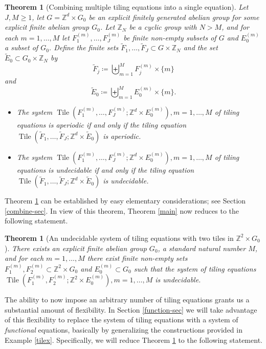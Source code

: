 \documentclass[reqno,a4paper,12pt]{amsart}
\numberwithin{equation}{section}
\numberwithin{figure}{section}
\def\Z{\mathbb{Z}}
\renewcommand\geq{\geqslant}
\newcommand{\Tile}{\operatorname{Tile}}
\theoremstyle{plain}
\newtheorem{theorem}[thm]{Theorem}
\theoremstyle{definition}
\begin{document}
\begin{theorem}[Combining multiple tiling equations into a single equation]\label{combine}  Let $J,M \geq 1$, let $G = \Z^d \times G_0$ be an explicit finitely generated abelian group for some explicit finite abelian group $G_0$.  Let $\Z_N$ be a cyclic group with $N>M$, and for each $m=1,\dots,M$ let $F_1^{(m)},\dots,F_J^{(m)}$ be finite non-empty subsets of $G$ and $E_0^{(m)}$ a subset of $G_0$.  Define the finite sets $\tilde F_1,\dots,\tilde F_J \subset G \times \Z_N$ and the set $\tilde E_0 \subset G_0 \times \Z_N$ by 
\begin{equation}\label{fj-stack}
 \tilde F_j \coloneqq \biguplus_{m=1}^M F_j^{(m)} \times \{m\}
 \end{equation}
and
\begin{equation}\label{e0-stack}
 \tilde E_0 \coloneqq \biguplus_{m=1}^M E_0^{(m)} \times \{m\}.
 \end{equation}
\begin{itemize}
\item[(i)]  The system $\Tile(F_1^{(m)},\dots,F_J^{(m)}; \Z^d \times E_0^{(m)}), m=1,\dots,M$ of tiling equations is aperiodic if and only if the tiling equation
$\Tile(\tilde F_1,\dots,\tilde F_J; \Z^d \times \tilde E_0)$ is aperiodic.
\item[(ii)]  The system $\Tile(F_1^{(m)},\dots,F_J^{(m)}; \Z^d \times E_0^{(m)}), m=1,\dots,M$ of tiling equations is undecidable if and only if the tiling equation
$\Tile(\tilde F_1,\dots,\tilde F_J; \Z^d \times \tilde E_0)$ is undecidable.
\end{itemize}
\end{theorem}

Theorem \ref{combine} can be established by easy elementary considerations; see Section \ref{combine-sec}. In view of this theorem, Theorem \ref{main} now reduces to the following statement.

\begin{theorem}[An undecidable system of tiling equations with two tiles in $\Z^2\times G_0$]\label{main-red}  There exists an explicit finite abelian group $G_0$, a standard natural number $M$, and for each $m=1,\dots,M$ there exist finite non-empty sets $F_1^{(m)}, F_2^{(m)} \subset \Z^2 \times G_0$ and $E_0^{(m)} \subset G_0$ such that the system of tiling equations $\Tile(F^{(m)}_1,F^{(m)}_2; \Z^2 \times E_0^{(m)}), m=1,\dots,M$ is undecidable.
\end{theorem}

The ability to now impose an arbitrary number of tiling equations grants us a substantial amount of flexibility.  In Section \ref{function-sec} we will take advantage of this flexibility to replace the system of tiling equations with a system of \emph{functional} equations, basically by generalizing the constructions provided in Example \ref{tilex}.  Specifically, we will reduce Theorem \ref{main-red} to the following statement. 
\end{document}
